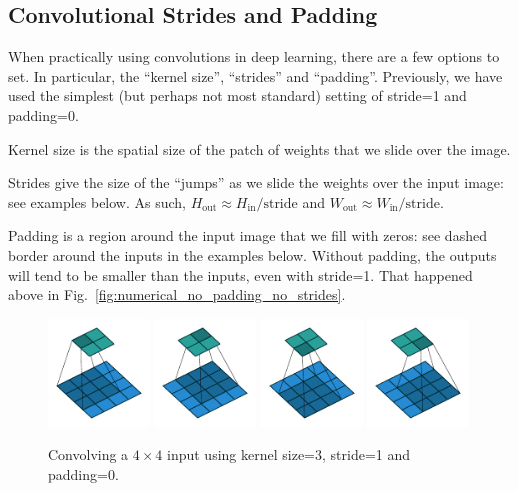 \documentclass{article}
\newcommand{\Win}{W_\text{in}}
\newcommand{\Wout}{W_\text{out}}
\newcommand{\Hin}{H_\text{in}}
\newcommand{\Hout}{H_\text{out}}
\begin{document}
\FloatBarrier
\clearpage
\subsection{Convolutional Strides and Padding}
When practically using convolutions in deep learning, there are a few options to set.
In particular, the ``kernel size'', ``strides'' and ``padding''.
Previously, we have used the simplest (but perhaps not most standard) setting of stride=1 and padding=0.

Kernel size is the spatial size of the patch of weights that we slide over the image.

Strides give the size of the ``jumps'' as we slide the weights over the input image: see examples below.
As such, $\Hout \approx \Hin/\text{stride}$ and $\Wout \approx \Win/\text{stride}$.

Padding is a region around the input image that we fill with zeros: see dashed border around the inputs in the examples below.
Without padding, the outputs will tend to be smaller than the inputs, even with stride=1.
That happened above in Fig.~\ref{fig:numerical_no_padding_no_strides}.

\begin{figure}[H]
    \centering
    \includegraphics[width=0.24\textwidth]{pdf/no_padding_no_strides_00.pdf}
    \includegraphics[width=0.24\textwidth]{pdf/no_padding_no_strides_01.pdf}
    \includegraphics[width=0.24\textwidth]{pdf/no_padding_no_strides_02.pdf}
    \includegraphics[width=0.24\textwidth]{pdf/no_padding_no_strides_03.pdf}
    \caption{\label{fig:no_padding_no_strides}
        Convolving a $4 \times 4$ input using kernel size=3, stride=1 and padding=0.}
\end{figure}
\end{document}
